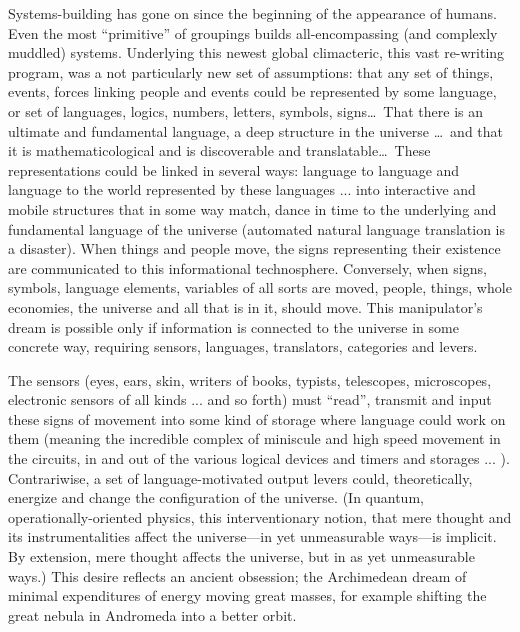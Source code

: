 Systems-building has gone on since the beginning of the appearance of humans.
Even the most \enquote{primitive} of groupings builds all-encompassing (and complexly
muddled) systems. Underlying this newest global climacteric, this vast re-writing program,
was a not particularly new set of assumptions: that any set of things, events,
forces linking people and events could be represented by some language, or set of
languages, logics, numbers, letters, symbols, signs\ldots\ That there is an ultimate and fundamental language, a deep structure in the
universe \ldots\ and that it is mathematicological and is discoverable and translatable\ldots\ These representations could be
linked in several ways: language to language and language to the world represented by
these languages ... into interactive and mobile structures that in some way match,
dance in time to the underlying and fundamental language of the universe (automated
natural language translation is a disaster). When things and people move, the signs
representing their existence are communicated to this informational technosphere.
Conversely, when signs, symbols, language elements, variables of all sorts are moved,
people, things, whole economies, the universe and all that is in it, should move. This
manipulator's dream is possible only if information is connected to the universe in
some concrete way, requiring sensors, languages, translators, categories and levers.

The sensors (eyes, ears, skin, writers of books, typists, telescopes, microscopes, 
electronic sensors of all kinds ... and so forth)
must \enquote{read}, transmit and input these signs of movement into some kind of storage
where language could work on them (meaning the incredible complex of miniscule and
high speed movement in the circuits, in and out of the various logical devices and timers
and storages ... ). Contrariwise, a set of language-motivated output levers could,
theoretically, energize and change the configuration of the universe. (In quantum,
operationally-oriented physics, this interventionary notion, that mere thought and its
instrumentalities affect the universe---in yet unmeasurable ways---is implicit. 
By extension, mere thought affects the universe, but in as yet unmeasurable ways.) This desire
reflects an ancient obsession; the Archimedean dream of minimal expenditures of energy 
moving great masses, for example shifting the great nebula in Andromeda into a
better orbit.

